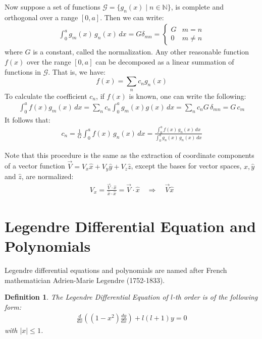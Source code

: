 \documentclass[11pt,oneside]{book}
\theoremstyle{break}
\theoremstyle{break}
\newtheorem{defn}{Definition}[corL]
\newcommand{\N}{\mathbb{N}}
\begin{document}
\hfill\break
\hfill\break
Now suppose a set of functions $\mathcal{G} = \{g_n(x)\mid n \in \N\}$, is complete and orthogonal over a range $[0,a]$. Then we can write:
\begin{align*}
\int_0^a g_m(x)\, g_n(x) \, dx = G \delta_{mn} = \begin{cases}G & m = n \\ 0 & m\neq n \end{cases}
\end{align*}
where $G$ is a constant, called the normalization. Any other reasonable function $f(x)$ over the range $[0,a]$ can be decomposed as a linear summation of functions in $\mathcal{G}$. That is, we have:
$$f(x) = \sum_n c_n g_n(x)$$
To calculate the coefficient $c_n$, if $f(x)$ is known, one can write the following:
\begin{align*}
\int_0^a f(x) g_m(x) \, dx = \sum_n c_n \int_0^a g_m(x) g(x) \, dx = \sum_n c_n G\,\delta_{mn} = G\,c_m
\end{align*}
It follows that:
\begin{align*}
c_n = \frac{1}{G} \int_0^a f(x)\, g_n(x)\, dx = \frac{\int_0^a f(x)\, g_n(x)\, dx}{\int_0^a g_n(x)\, g_n(x)\, dx}
\end{align*}

Note that this procedure is the same as the extraction of coordinate components of a vector function $\vec{V} = V_x\hat{x}+V_y\hat{y}+V_z \hat{z}$, except the bases for vector spaces, $\hat{x},\hat{y}$ and $\hat{z}$, are normalized:
\begin{align*}
V_x = \frac{\vec{V}\cdot \hat{x}}{\hat{x}\cdot \hat{x}} = \vec{V}\cdot \hat{x}\quad\Rightarrow\quad \vec{V}\hat{x}
\end{align*}
\newpage

\section[Legendre Differential Equation and Polynomials]{\color{red}Legendre Differential Equation and Polynomials\color{black}}
Legendre differential equations and polynomials are named after French mathematician Adrien-Marie Legendre (1752-1833).

\begin{defn}
The Legendre Differential Equation of $l$-th order is of the following form:
\begin{align*}
\frac{d}{dx}\left( (1-x^2) \frac{dy}{dx}\right) + l(l+1)y = 0
\end{align*}
with $|x|\leq 1$.
\end{defn}
\end{document}
